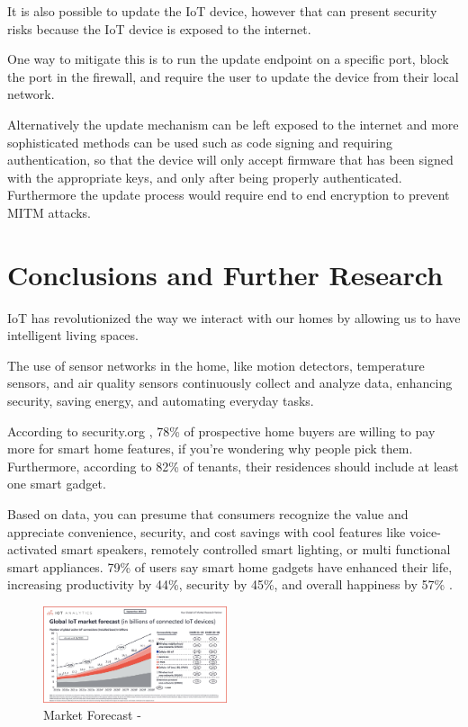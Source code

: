 \documentclass[10pt, journal]{IEEEtran} %
\begin{document}
It is also possible to update the IoT device, however that can present security risks
because the IoT device is exposed to the internet.

One way to mitigate this is to run the update endpoint on a specific port,
block the port in the firewall,
and require the user to update the device from their local network.

Alternatively the update mechanism can be left exposed to the internet
and more sophisticated methods can be used such as code signing and requiring authentication,
so that the device will only accept firmware that has been signed with the appropriate keys,
and only after being properly authenticated.
Furthermore the update process would require end to end encryption to prevent MITM attacks.


\section{Conclusions and Further Research}



IoT has revolutionized the way we interact with our homes 
by allowing us to have intelligent living spaces.

The use of sensor networks in the home, like motion detectors, temperature sensors, 
and air quality sensors continuously collect and analyze data,
enhancing security, saving energy, and automating everyday tasks.

According to security.org \cite[Vigderman]{Vigderman}, 78\% of prospective home buyers are willing to pay more for smart home features, 
if you're wondering why people pick them.
Furthermore, according to 82\% of tenants, their residences should include at least one smart gadget\cite[Howell]{Howell}.

Based on data, you can presume that consumers recognize the value and appreciate convenience, security, 
and cost savings with cool features like voice-activated smart speakers, remotely controlled smart lighting, 
or multi functional smart appliances. 79\% of users say smart home gadgets have enhanced their life, 
increasing productivity by 44\%, security by 45\%, and overall happiness by 57\% \cite[Howarth]{Howarth}.


\begin{figure}[htbp]
    \centering
    \includegraphics[width=0.48\textwidth]{images/forecast.png}
    \caption{Market Forecast - \cite[Sinha]{Sinha}}
    \label{fig:forecast}
\end{figure}
\end{document}
